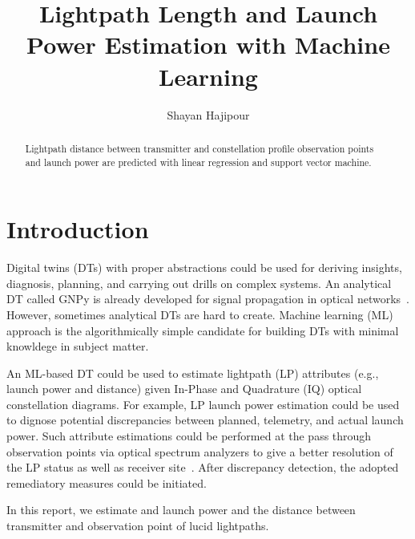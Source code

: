 \documentclass[lettersize,journal, one-column]{IEEEtran}
\begin{document}
\title{Lightpath Length and Launch Power Estimation with Machine Learning}

\author{Shayan Hajipour}


\maketitle

\begin{abstract}
Lightpath distance between transmitter and constellation profile observation points and launch power are predicted with linear regression and support vector machine.
\end{abstract}

\section{Introduction}
\label{section:introduction}
Digital twins (DTs) with proper abstractions could be used for deriving insights, diagnosis, planning, and carrying out drills on complex systems.
An analytical DT called GNPy is already developed for signal propagation in optical networks~\cite{gnpy}.
However, sometimes analytical DTs are hard to create.
Machine learning (ML) approach is the algorithmically simple candidate for building DTs with minimal knowldege in subject matter.

An ML-based DT could be used to estimate lightpath (LP) attributes (e.g., launch power and distance) given In-Phase and Quadrature (IQ) optical constellation diagrams.
For example, LP launch power estimation could be used to dignose potential discrepancies between planned, telemetry, and actual launch power. 
Such attribute estimations could be performed at the pass through observation points via optical spectrum analyzers to give a better resolution of the LP status as well as receiver site~\cite{9761942}.
After discrepancy detection, the adopted remediatory measures could be initiated.

In this report, we estimate and launch power and the distance between transmitter and observation point of lucid lightpaths.
\end{document}
